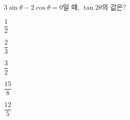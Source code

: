 $3\sin\theta-2\cos\theta=0$일 때, $\tan 2\theta$의 값은?
\begin{choices32}{\rule[-3ex]{0pt}{8ex}$\dfrac{1}{2}$}{\rule[-3ex]{0pt}{8ex}$\dfrac{2}{3}$}{\rule[-3ex]{0pt}{8ex}$\dfrac{3}{2}$}{\rule[-3ex]{0pt}{8ex}$\dfrac{15}{8}$}{\rule[-3ex]{0pt}{8ex}$\dfrac{12}{5}$}\end{choices32}
